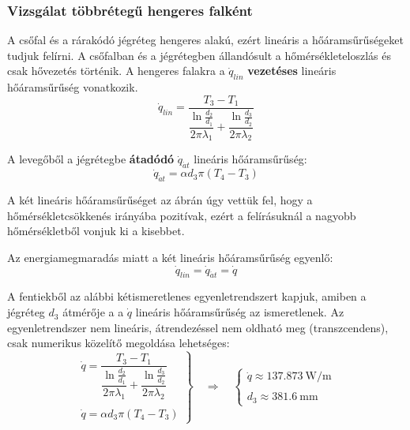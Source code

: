 \subsubsection*{Vizsgálat többrétegű hengeres falként}
A csőfal és a rárakódó jégréteg hengeres alakú, ezért lineáris a hőáramsűrűségeket tudjuk felírni. A csőfalban és a jégrétegben állandósult a hőmérsékleteloszlás és csak hővezetés történik. A hengeres falakra a $\dot{q}_{lin}$ \textbf{vezetéses} lineáris hőáramsűrűség vonatkozik.
\begin{equation}
	\dot{q}_{lin} = \dfrac{T_3 - T_1}{\dfrac{\ln\frac{d_2}{d_1}}{2 \pi \lambda_1} + \dfrac{\ln\frac{d_3}{d_2}}{2 \pi \lambda_2}}
\end{equation}

A levegőből a jégrétegbe \textbf{átadódó} $\dot{q}_{\acute{a}t}$ lineáris hőáramsűrűség: 
\begin{equation}
	\dot{q}_{\acute{a}t} = \alpha d_3 \pi (T_4 - T_3)
\end{equation}

A két lineáris hőáramsűrűséget az ábrán úgy vettük fel, hogy a hőmérsékletcsökkenés irányába pozitívak, ezért a felírásuknál a nagyobb hőmérsékletből vonjuk ki a kisebbet.

Az energiamegmaradás miatt a két lineáris hőáramsűrűség egyenlő:
\begin{equation}
	\dot{q}_{lin} = \dot{q}_{\acute{a}t} = \dot{q}
\end{equation}

A fentiekből az alábbi kétismeretlenes egyenletrendszert kapjuk, amiben a jégréteg $d_3$ átmérője a a $\dot{q}$ lineáris hőáramsűrűség az ismeretlenek. Az egyenletrendszer nem lineáris, átrendezéssel nem oldható meg (transzcendens), csak numerikus közelítő megoldása lehetséges:
\begin{equation}
	\left.
	\begin{array}{lcl}
		\dot{q} = \dfrac{T_3 - T_1}{\dfrac{\ln\frac{d_2}{d_1}}{2 \pi \lambda_1} + \dfrac{\ln\frac{d_3}{d_2}}{2 \pi \lambda_2}} \\ \\
		\dot{q} = \alpha d_3 \pi (T_4 - T_3)
	\end{array}
	\right\rbrace
	\quad \Rightarrow \quad 
	\left\lbrace
	\begin{array}{lcl}
		\dot{q} \approx \SI{137.873}{\watt\per\meter} \\ \\
		d_3 \approx \SI{381.6}{\milli\meter}
	\end{array}
	\right.
\end{equation}

